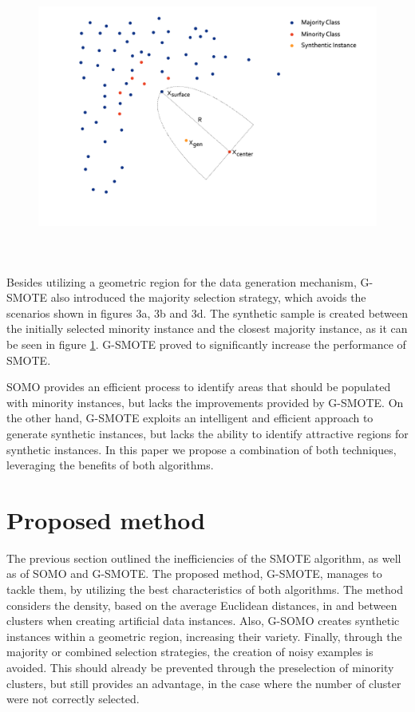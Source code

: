 \documentclass[parskip=full]{scrartcl}
\begin{document}
\begin{figure}[H]
	\centering
	\includegraphics[width=12cm, height=9.5cm, keepaspectratio]{../analysis/fig4.png}
	\label{fig:GSMOTE}
\end{figure}

Besides utilizing a geometric region for the data generation mechanism, G-SMOTE also introduced the majority selection strategy, which avoids the scenarios shown in figures 3a, 3b and 3d. The synthetic sample is created between the initially selected minority instance and the closest majority instance, as it can be seen in figure \ref{fig:GSMOTE}. G-SMOTE proved to significantly increase the performance of SMOTE.

SOMO provides an efficient process to identify areas that should be populated
with minority instances, but lacks the improvements provided by G-SMOTE. On the
other hand, G-SMOTE exploits an intelligent and efficient approach to generate
synthetic instances, but lacks the ability to identify attractive regions for
synthetic instances. In this paper we propose a combination of both techniques,
leveraging the benefits of both algorithms.

\section{Proposed method}

The previous section outlined the inefficiencies of the SMOTE algorithm, as well as of SOMO and G-SMOTE. The proposed method, G-SMOTE, manages to tackle them, by utilizing the best characteristics of both algorithms. The method considers the density, based on the average Euclidean distances, in and between clusters when creating artificial data instances. Also, G-SOMO creates synthetic instances within a geometric region, increasing their variety. Finally, through the majority or combined selection strategies, the creation of noisy examples is avoided. This should already be prevented through the preselection of minority clusters, but still provides an advantage, in the case where the number of cluster were not correctly selected.
\end{document}
